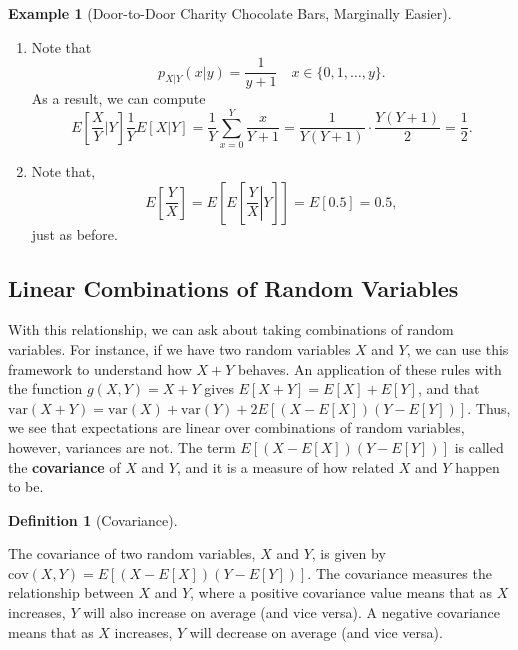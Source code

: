 \documentclass[
  letterpaper,
  DIV=11,
  numbers=noendperiod]{scrreprt}
\providecommand{\tightlist}{%
  \setlength{\itemsep}{0pt}\setlength{\parskip}{0pt}}\usepackage{longtable,booktabs,array}
\theoremstyle{definition}
\theoremstyle{definition}
\newtheorem{example}{Example}[chapter]
\theoremstyle{definition}
\newtheorem{definition}{Definition}[chapter]
\theoremstyle{remark}
\begin{document}
\begin{example}[Door-to-Door Charity Chocolate Bars, Marginally
Easier]
\begin{tcolorbox}[enhanced jigsaw, colback=white, colframe=quarto-callout-color-frame, arc=.35mm, leftrule=.75mm, rightrule=.15mm, opacityback=0, breakable, bottomrule=.15mm, left=2mm, toprule=.15mm]
\begin{enumerate}
\def\labelenumi{\alph{enumi}.}
\tightlist
\item
  Note that
  \[p_{X|Y}(x|y) = \frac{1}{y+1} \quad x \in \{0,1,\dots,y\}.\] As a
  result, we can compute
  \[E[\frac{X}{Y}|Y] \frac{1}{Y}E[X|Y]= \frac{1}{Y}\sum_{x=0}^{Y} \frac{x}{Y+1} = \frac{1}{Y(Y+1)}\cdot\frac{Y(Y+1)}{2} = \frac{1}{2}.\]
\item
  Note that,
  \[E\left[\frac{Y}{X}\right] = E\left[E\left[\left.\frac{Y}{X}\right|Y\right]\right] = E[0.5] = 0.5,\]
  just as before.
\end{enumerate}

\end{tcolorbox}

\end{example}

\subsection{Linear Combinations of Random
Variables}\label{linear-combinations-of-random-variables}

With this relationship, we can ask about taking combinations of random
variables. For instance, if we have two random variables \(X\) and
\(Y\), we can use this framework to understand how \(X + Y\) behaves. An
application of these rules with the function \(g(X,Y) = X + Y\) gives
\(E[X+Y] = E[X] + E[Y]\), and that
\(\text{var}(X + Y) = \text{var}(X) + \text{var}(Y) + 2E[(X-E[X])(Y - E[Y])]\).
Thus, we see that expectations are linear over combinations of random
variables, however, variances are not. The term
\(E[(X-E[X])(Y - E[Y])]\) is called the \textbf{covariance} of \(X\) and
\(Y\), and it is a measure of how related \(X\) and \(Y\) happen to be.

\begin{definition}[Covariance]\protect\hypertarget{def-covariance}{}\label{def-covariance}

The covariance of two random variables, \(X\) and \(Y\), is given by
\(\text{cov}(X,Y) = E[(X - E[X])(Y - E[Y])]\). The covariance measures
the relationship between \(X\) and \(Y\), where a positive covariance
value means that as \(X\) increases, \(Y\) will also increase on average
(and vice versa). A negative covariance means that as \(X\) increases,
\(Y\) will decrease on average (and vice versa).

\end{definition}
\end{document}
